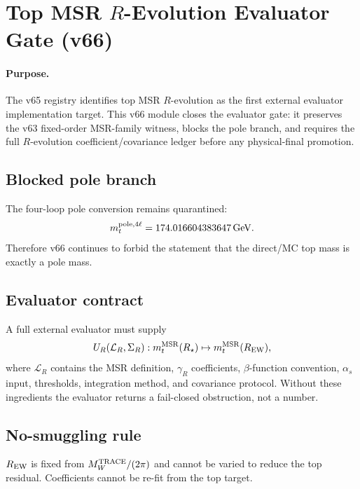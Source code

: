 
\section{Top MSR $R$-Evolution Evaluator Gate (v66)}
\label{sec:v66-top-msr-r-evolution-gate}

\paragraph{Purpose.}
The v65 registry identifies top MSR $R$-evolution as the first external evaluator implementation target.  This v66 module closes the evaluator gate: it preserves the v63 fixed-order MSR-family witness, blocks the pole branch, and requires the full $R$-evolution coefficient/covariance ledger before any physical-final promotion.

\begin{center}
\end{center}

\subsection{Blocked pole branch}
The four-loop pole conversion remains quarantined:
\[
  m_t^{\rm pole,4\ell}=174.016604383647\,\mathrm{GeV}.
\]
Therefore v66 continues to forbid the statement that the direct/MC top mass is exactly a pole mass.

\subsection{Evaluator contract}
A full external evaluator must supply
\[
  U_R(\mathcal L_R,\Sigma_R):m_t^{\rm MSR}(R_\star)\mapsto m_t^{\rm MSR}(R_{\rm EW}),
\]
where $\mathcal L_R$ contains the MSR definition, $\gamma_R$ coefficients, $\beta$-function convention, $\alpha_s$ input, thresholds, integration method, and covariance protocol.  Without these ingredients the evaluator returns a fail-closed obstruction, not a number.

\subsection{No-smuggling rule}
$R_{\rm EW}$ is fixed from $M_W^{\rm TRACE}/(2\pi)$ and cannot be varied to reduce the top residual.  Coefficients cannot be re-fit from the top target.

\begin{center}
\end{center}
